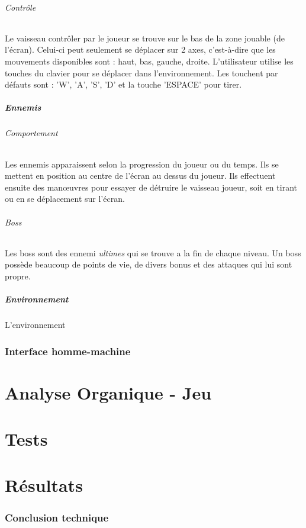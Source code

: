 \documentclass[11pt, a4paper, oneside]{article}
\begin{document}
\paragraph{Contrôle}
Le vaisseau contrôler par le joueur se trouve sur le bas de la zone jouable (de l'écran). Celui-ci peut seulement se déplacer sur 2 axes, c'est-à-dire que les mouvements disponibles sont : haut, bas, gauche, droite. L'utilisateur utilise les touches du clavier pour se déplacer dans l'environnement. Les touchent par défauts sont : 'W', 'A', 'S', 'D' et la touche 'ESPACE' pour tirer.
\subsubsection{Ennemis}
\paragraph{Comportement}
Les ennemis apparaissent selon la progression du joueur ou du temps. Ils se mettent en position au centre de l'écran au dessus du joueur. Ils effectuent ensuite des manœuvres pour essayer de détruire le vaisseau joueur, soit en tirant ou en se déplacement sur l'écran.
\paragraph{Boss}
Les boss sont des ennemi \emph{ultimes} qui se trouve a la fin de chaque niveau. Un boss possède beaucoup de points de vie, de divers bonus et des attaques qui lui sont propre.
\subsubsection{Environnement}
L'environnement 
\section{Interface homme-machine}
\newpage
\part{Analyse Organique - Jeu}
\newpage
\part{Tests}
\newpage
\part{Résultats} 
\section{Conclusion technique}
\end{document}
